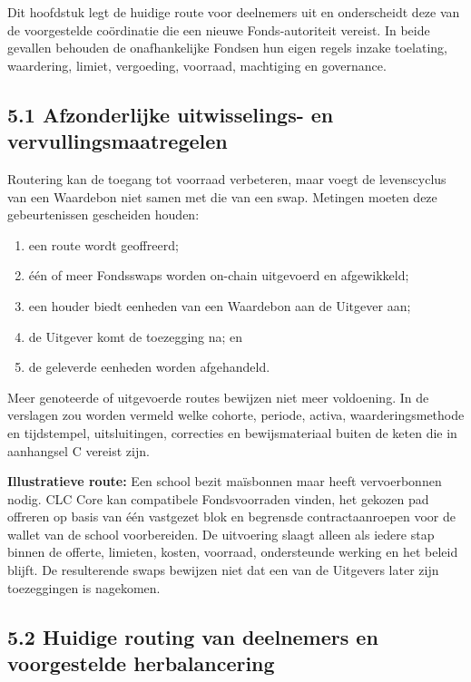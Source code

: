 \documentclass[11pt]{article}
\begin{document}
Dit hoofdstuk legt de huidige route voor deelnemers uit en onderscheidt deze van de voorgestelde coördinatie die een nieuwe Fonds-autoriteit vereist. In beide gevallen behouden de onafhankelijke Fondsen hun eigen regels inzake toelating, waardering, limiet, vergoeding, voorraad, machtiging en governance.

\subsection*{5.1 Afzonderlijke uitwisselings- en vervullingsmaatregelen}

Routering kan de toegang tot voorraad verbeteren, maar voegt de levenscyclus van een Waardebon niet samen met die van een swap. Metingen moeten deze gebeurtenissen gescheiden houden:

\begin{enumerate}[leftmargin=*]
\item een route wordt geoffreerd;
\item één of meer Fondsswaps worden on-chain uitgevoerd en afgewikkeld;
\item een houder biedt eenheden van een Waardebon aan de Uitgever aan;
\item de Uitgever komt de toezegging na; en
\item de geleverde eenheden worden afgehandeld.
\end{enumerate}
Meer genoteerde of uitgevoerde routes bewijzen niet meer voldoening. In de verslagen zou worden vermeld welke cohorte, periode, activa, waarderingsmethode en tijdstempel, uitsluitingen, correcties en bewijsmateriaal buiten de keten die in aanhangsel C vereist zijn.

\textbf{Illustratieve route:} Een school bezit maïsbonnen maar heeft vervoerbonnen nodig. CLC Core kan compatibele Fondsvoorraden vinden, het gekozen pad offreren op basis van één vastgezet blok en begrensde contractaanroepen voor de wallet van de school voorbereiden. De uitvoering slaagt alleen als iedere stap binnen de offerte, limieten, kosten, voorraad, ondersteunde werking en het beleid blijft. De resulterende swaps bewijzen niet dat een van de Uitgevers later zijn toezeggingen is nagekomen.

\subsection*{5.2 Huidige routing van deelnemers en voorgestelde herbalancering}
\end{document}
